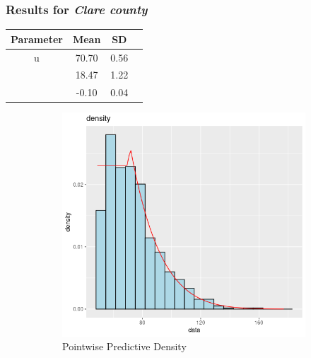 \documentclass[usenames,dvipsnames]{beamer}
\begin{document}
\begin{frame}
\frametitle{Results for \textit{Clare county}}
   \begin{center}
        \begin{tabular}{ |c|c|c|c| } 
            \hline
            \textbf{Parameter}&\textbf{Mean}&\textbf{SD}\\ 
            \hline

			u &70.70&0.56\\
            \hline
			\sigma &18.47&1.22\\
            \hline
			\xi &-0.10&0.04\\
\hline
\end{tabular}
\end{center}
\begin{figure}
  \centering
  \begin{subfigure}[b]{0.4\textwidth}
    \includegraphics[width=\textwidth]{clare30DensityGPD.png}
    \caption{Pointwise Predictive Density}
    \label{fig:sub1}
  \end{subfigure}
  \hfill
  \begin{subfigure}[b]{0.4\textwidth}

\end{subfigure}
\end{figure}
\end{frame}
\end{document}

